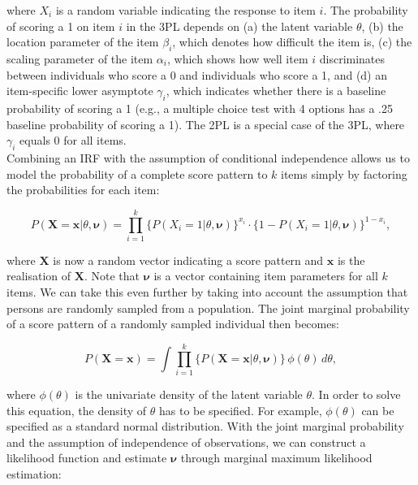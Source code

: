 \documentclass[Royal,sageapa,times,doublespace]{sagej}
\begin{document}
where $X_i$ is a random variable indicating the response to item $i$. The probability of scoring a 1 on item $i$ in the 3PL depends on (a) the latent variable $\theta$, (b) the location parameter of the item $\beta_{i}$, which denotes how difficult the item is, (c) the scaling parameter of the item $\alpha_{i}$, which shows how well item $i$ discriminates between individuals who score a 0 and individuals who score a 1, and (d) an item-specific lower asymptote $\gamma_{i}$, which indicates whether there is a baseline probability of scoring a 1 (e.g., a multiple choice test with 4 options has a .25 baseline probability of scoring a 1). The 2PL is a special case of the 3PL, where $\gamma_{i}$ equals 0 for all items. \\
\indent Combining an IRF with the assumption of conditional independence allows us to model the probability of a complete score pattern to $k$ items simply by factoring the probabilities for each item:

\begin{equation}
P(\boldsymbol{X} = \boldsymbol{x} | \theta, \boldsymbol{\nu}) = \prod_{i=1}^{k} \{P(X_i = 1 | \theta, \boldsymbol{\nu})\}^{x_i} \cdot  \{1 - P(X_i = 1 | \theta, \boldsymbol{\nu}) \}^{1 - x_i},
\end{equation}

where $\boldsymbol{X}$ is now a random vector indicating a score pattern and $\boldsymbol{x}$ is the realisation of $\boldsymbol{X}$. Note that $\boldsymbol{\nu}$ is a vector containing item parameters for all $k$ items. We can take this even further by taking into account the assumption that persons are randomly sampled from a population. The joint marginal probability of a score pattern of a randomly sampled individual then becomes:

\begin{equation}
P(\boldsymbol{X} = \boldsymbol{x}) = \int \prod_{i=1}^{k} \{ P(\boldsymbol{X} = \boldsymbol{x} | \theta, \boldsymbol{\nu}) \} \,\phi(\theta)\,d\theta,
\end{equation}

where $\phi(\theta)$ is the univariate density of the latent variable $\theta$. In order to solve this equation, the density of $\theta$ has to be specified. For example, $\phi(\theta)$ can be specified as a standard normal distribution. With the joint marginal probability and the assumption of independence of observations, we can construct a likelihood function and estimate $\boldsymbol{\nu}$ through marginal maximum likelihood estimation:
\end{document}
